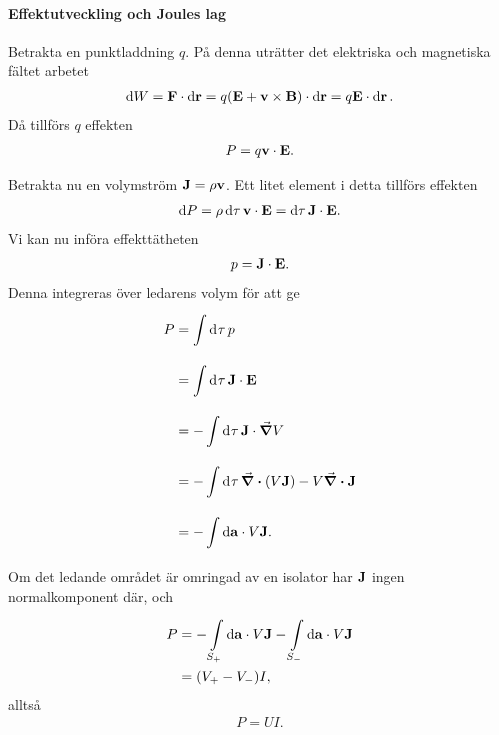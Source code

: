 \paragraph{Effektutveckling och Joules lag}
Betrakta en punktladdning $q$. På denna uträtter det elektriska och magnetiska fältet arbetet
\begin{align*}
	\dd{W} = \vb{F}\cdot\dd{\vb{r}} = q(\vb{E} + \vb{v}\times\vb{B})\cdot\dd{\vb{r}} = q\vb{E}\cdot\dd{\vb{r}}.
\end{align*}
Då tillförs $q$ effekten
\begin{align*}
	P = q\vb{v}\cdot\vb{E}.
\end{align*}

Betrakta nu en volymström $\vb{J} = \rho\vb{v}$. Ett litet element i detta tillförs effekten
\begin{align*}
	\dd{P} = \rho\dd{\tau}\vb{v}\cdot\vb{E} = \dd{\tau}\vb{J}\cdot\vb{E}.
\end{align*}
Vi kan nu införa effekttätheten
\begin{align*}
	p = \vb{J}\cdot\vb{E}.
\end{align*}
Denna integreras över ledarens volym för att ge
\begin{align*}
	P &= \int\limits_{}^{}\dd[]{\tau}p \\
	  &= \int\limits_{}^{}\dd[]{\tau}\vb{J}\cdot\vb{E} \\
	  &= -\int\limits_{}^{}\dd[]{\tau}\vb{J}\cdot\grad{V} \\
	  &= -\int\limits_{}^{}\dd[]{\tau}\div(V\vb{J}) - V\div{\vb{J}} \\
	  &= -\int\limits_{}^{}\dd{\vb{a}}\cdot V\vb{J}.
\end{align*}
Om det ledande området är omringad av en isolator har $\vb{J}$ ingen normalkomponent där, och
\begin{align*}
	P &= -\int\limits_{S_{+}}^{}\dd{\vb{a}}\cdot V\vb{J} - \int\limits_{S_{-}}^{}\dd{\vb{a}}\cdot V\vb{J} \\
	  &= (V_{+} - V_{-})I,
\end{align*}
alltså
\begin{align*}
	P = UI.
\end{align*}

